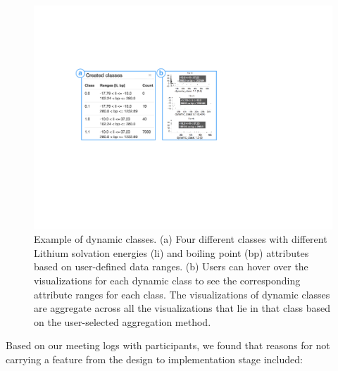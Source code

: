 \begin{figure}[h!]
  \centering
  \includegraphics[width=0.9\linewidth]{figures/dcc.pdf}
  \caption{Example of dynamic classes. (a) Four different classes with different Lithium solvation energies (li) and boiling point (bp) attributes based on user-defined data ranges. (b) Users can hover over the visualizations for each dynamic class to see the corresponding attribute ranges for each class. The visualizations of dynamic classes are aggregate across all the visualizations that lie in that class based on the user-selected aggregation method.}
  \label{dcc}
  \vspace{-10pt}
\end{figure}
\npar {} Based on our meeting logs with participants, we found that reasons for not carrying a feature from the design to implementation stage included:
